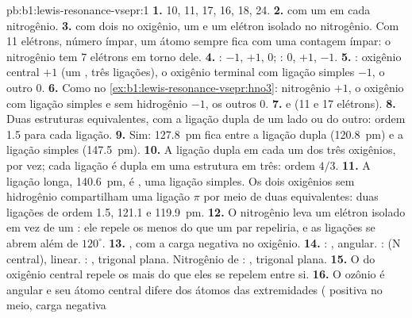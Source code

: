 \begin{solution}{pb:b1:lewis-resonance-vsepr:1}
\textbf{1.}  10,  11,  17,  16,  18,
 24.
\textbf{2.}  com um  em cada nitrogênio.
\textbf{3.}  com dois  no oxigênio, um  e um elétron isolado no nitrogênio. Com 11 elétrons, número
ímpar, um átomo sempre fica com uma contagem ímpar: o nitrogênio tem 7
elétrons em torno dele.
\textbf{4.} : $-1$, $+1$, $0$; : $0$, $+1$, $-1$.
\textbf{5.} : oxigênio central $+1$ (um , três
ligações), o oxigênio terminal com ligação simples $-1$, o outro 0.
\textbf{6.} Como no \cref{ex:b1:lewis-resonance-vsepr:hno3}: nitrogênio $+1$,
o oxigênio com ligação simples e sem hidrogênio $-1$, os outros 0.
\textbf{7.}  e  (11 e 17 elétrons).
\textbf{8.} Duas estruturas equivalentes, com a ligação dupla de um lado
ou do outro: ordem 1.5 para cada ligação.
\textbf{9.} Sim: \qty{127.8}{pm} fica entre a ligação dupla
(\qty{120.8}{pm}) e a ligação simples (\qty{147.5}{pm}).
\textbf{10.} A ligação dupla em cada um dos três oxigênios, por vez; cada
ligação  é dupla em uma estrutura em três: ordem $4/3$.
\textbf{11.} A ligação longa, \qty{140.6}{pm}, é , uma ligação
simples. Os dois oxigênios sem hidrogênio compartilham uma ligação $\pi$
por meio de duas  equivalentes: duas ligações de
ordem 1.5, 121.1 e
\qty{119.9}{pm}.
\textbf{12.} O nitrogênio leva um elétron isolado em vez de um : ele repele os  menos do que um par repeliria, e
as ligações se abrem além de $120^\circ$.
\textbf{13.} , com a carga negativa no oxigênio.
\textbf{14.} : , angular. :  (N central),
linear. : , trigonal plana. Nitrogênio de :
, trigonal plana.
\textbf{15.} O  do oxigênio central repele os  mais do que eles se repelem entre si.
\textbf{16.} O ozônio é angular e seu átomo central difere dos átomos
das extremidades ( positiva no meio, carga negativa

\end{solution}
